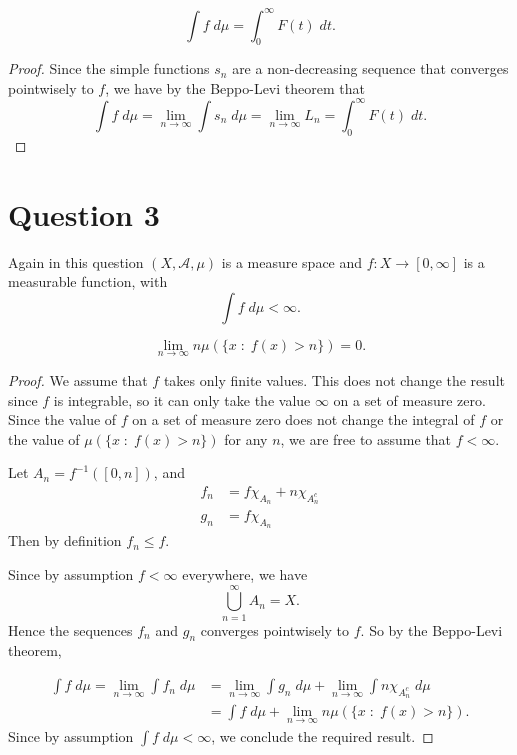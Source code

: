 \documentclass{unswmaths}
\begin{document}
\begin{theorem}
    \begin{equation*}
        \int f\;d\mu = \int_0^\infty F(t)\;dt.
    \end{equation*}
\end{theorem}
\begin{proof}
    Since the simple functions $s_n$ are a non-decreasing sequence that converges 
    pointwisely to $f$, we have by the Beppo-Levi theorem that
    \begin{equation*}
        \int f\;d\mu = \lim_{n\rightarrow\infty} \int s_n\;d\mu = \lim_{n\rightarrow\infty} L_n = \int_{0}^\infty F(t)\;dt.
    \end{equation*}
\end{proof}


\section*{Question 3}
Again in this question $(X,\mathcal{A},\mu)$ is a measure space
and $f:X\rightarrow [0,\infty]$ is a measurable function, with
\begin{equation*}
    \int f\;d\mu < \infty.
\end{equation*}
\begin{theorem}
    \begin{equation*}
        \lim_{n\rightarrow\infty} n\mu(\{x\;:\;f(x) > n\}) = 0.
    \end{equation*}
\end{theorem}
\begin{proof}
    We assume that $f$ takes only finite values. This does not
    change the result since $f$ is integrable, so it can 
    only take the value $\infty$ on a set of measure zero.
    Since the value of $f$ on a set of measure zero
    does not change the integral of $f$ or
    the value of $\mu(\{x\;:\;f(x) > n\})$ for any $n$, we are free
    to assume that $f < \infty$.

    Let $A_n = f^{-1}([0,n])$, and
    \begin{align*}
        f_n &= f\chi_{A_n} + n\chi_{A_n^c}\\
        g_n &= f\chi_{A_n}
    \end{align*}
    Then by definition $f_n \leq f$.
    
    Since by assumption $f < \infty$ everywhere, we have
    \begin{equation*}
        \bigcup_{n=1}^\infty A_n = X.
    \end{equation*}    
    Hence the sequences $f_n$ and $g_n$ converges pointwisely to $f$.
    So by the Beppo-Levi theorem,
    
    \begin{align*}
        \int f\;d\mu = \lim_{n\rightarrow\infty} \int f_n\;d\mu &= \lim_{n\rightarrow\infty} \int g_n\;d\mu + \lim_{n\rightarrow\infty} \int n\chi_{A_n^c}\;d\mu\\
        &= \int f\;d\mu + \lim_{n\rightarrow\infty} n\mu(\{x\;:\;f(x) > n\}).
    \end{align*}
    Since by assumption $\int f\;d\mu <\infty$, we conclude the required result.
\end{proof}
\end{document}
